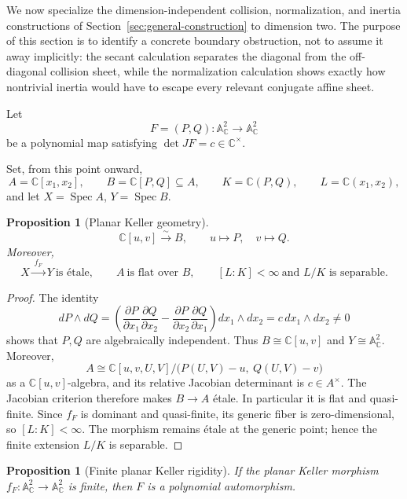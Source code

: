\documentclass[11pt]{article}
\newtheorem{proposition}[theorem]{Proposition}
\theoremstyle{remark}
\theoremstyle{definition}
\DeclareMathOperator{\Spec}{Spec}
\newcommand{\A}{\mathbb A}
\newcommand{\C}{\mathbb C}
\begin{document}
We now specialize the dimension-independent collision, normalization,
and inertia constructions of Section~\ref{sec:general-construction} to
dimension two.  The purpose of this section is to identify a concrete
boundary obstruction, not to assume it away implicitly: the secant
calculation separates the diagonal from the off-diagonal collision sheet,
while the normalization calculation shows exactly how nontrivial inertia
would have to escape every relevant conjugate affine sheet.

Let
\[
  F=(P,Q)\colon\A^2_{\C}\longrightarrow\A^2_{\C}
\]
be a polynomial map satisfying
\(\det JF=c\in\C^\times\).

Set, from this point onward,
\[
  A=\C[x_1,x_2],
  \qquad
  B=\C[P,Q]\subseteq A,
  \qquad
  K=\C(P,Q),
  \qquad
  L=\C(x_1,x_2),
\]
and let \(X=\Spec A\), \(Y=\Spec B\).

\begin{proposition}[Planar Keller geometry]
\label{prop:planar-keller-local-geometry}
\[
  \C[u,v]\xrightarrow{\sim}B,
  \qquad
  u\longmapsto P,\quad v\longmapsto Q.
\]
Moreover,
\[
  X\xrightarrow{\ f_F\ }Y\ \text{is \'etale},
  \qquad
  A\ \text{is flat over }B,
  \qquad
  [L:K]<\infty
  \ \text{and }L/K\text{ is separable}.
\]
\end{proposition}

\begin{proof}
The identity
\[
  dP\wedge dQ
  =
  \left(
    \frac{\partial P}{\partial x_1}
    \frac{\partial Q}{\partial x_2}
    -
    \frac{\partial P}{\partial x_2}
    \frac{\partial Q}{\partial x_1}
  \right)dx_1\wedge dx_2
  =
  c\,dx_1\wedge dx_2
  \neq0
\]
shows that \(P,Q\) are algebraically independent.  Thus
\(B\cong\C[u,v]\) and \(Y\cong\A^2_{\C}\).  Moreover,
\[
  A
  \cong
  \C[u,v,U,V]\big/\bigl(P(U,V)-u,\ Q(U,V)-v\bigr)
\]
as a \(\C[u,v]\)-algebra, and its relative Jacobian determinant is
\(c\in A^\times\).  The
Jacobian criterion therefore makes \(B\to A\) \'etale.  In particular
it is flat and quasi-finite.  Since \(f_F\) is dominant and
quasi-finite, its generic fiber is zero-dimensional, so
\([L:K]<\infty\).  The morphism remains \'etale at the generic point;
hence the finite extension \(L/K\) is separable.
\end{proof}

\begin{proposition}[Finite planar Keller rigidity]
\label{prop:finite-planar-keller-rigidity}
If the planar Keller morphism
\(f_F\colon\A^2_{\C}\to\A^2_{\C}\) is finite, then \(F\) is a
polynomial automorphism.
\end{proposition}
\end{document}
